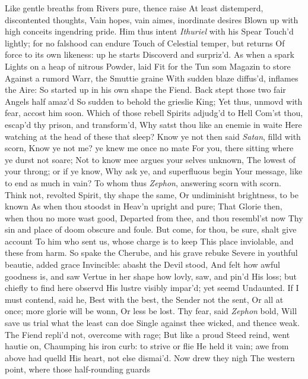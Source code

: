 \documentclass[11pt]{book}
\begin{document}
Like gentle breaths from Rivers pure, thence raise 
At least distemperd, discontented thoughts, 
Vain hopes, vain aimes, inordinate desires 
Blown up with high conceits ingendring pride. 
Him thus intent \textit{Ithuriel} with his Spear 
Touch'd lightly; for no falshood can endure 
Touch of Celestial temper, but returns 
Of force to its own likeness: up he starts 
Discoverd and surpriz'd.  As when a spark 
Lights on a heap of nitrous Powder, laid 
Fit for the Tun som Magazin to store 
Against a rumord Warr, the Smuttie graine 
With sudden blaze diffus'd, inflames the Aire: 
So started up in his own shape the Fiend. 
Back stept those two fair Angels half amaz'd 
So sudden to behold the grieslie King; 
Yet thus, unmovd with fear, accost him soon. 
\quad Which of those rebell Spirits adjudg'd to Hell 
Com'st thou, escap'd thy prison, and transform'd, 
Why satst thou like an enemie in waite 
Here watching at the head of these that sleep? 
\quad Know ye not then said \textit{Satan}, filld with scorn, 
Know ye not me? ye knew me once no mate 
For you, there sitting where ye durst not soare; 
Not to know mee argues your selves unknown, 
The lowest of your throng; or if ye know, 
Why ask ye, and superfluous begin 
Your message, like to end as much in vain? 
To whom thus \textit{Zephon}, answering scorn with scorn. 
Think not, revolted Spirit, thy shape the same, 
Or undiminisht brightness, to be known 
As when thou stoodst in Heav'n upright and pure; 
That Glorie then, when thou no more wast good, 
Departed from thee, and thou resembl'st now 
Thy sin and place of doom obscure and foule. 
But come, for thou, be sure, shalt give account 
To him who sent us, whose charge is to keep 
This place inviolable, and these from harm. 
\quad So spake the Cherube, and his grave rebuke 
Severe in youthful beautie, added grace 
Invincible: abasht the Devil stood, 
And felt how awful goodness is, and saw 
Vertue in her shape how lovly, saw, and pin'd 
His loss; but chiefly to find here observd 
His lustre visibly impar'd; yet seemd 
Undaunted.  If I must contend, said he, 
Best with the best, the Sender not the sent, 
Or all at once; more glorie will be wonn, 
Or less be lost.  Thy fear, said \textit{Zephon} bold, 
Will save us trial what the least can doe 
Single against thee wicked, and thence weak. 
\quad The Fiend repli'd not, overcome with rage; 
But like a proud Steed reind, went hautie on, 
Chaumping his iron curb: to strive or flie 
He held it vain; awe from above had quelld 
His heart, not else dismai'd.  Now drew they nigh 
The western point, where those half-rounding guards 
\end{document}
